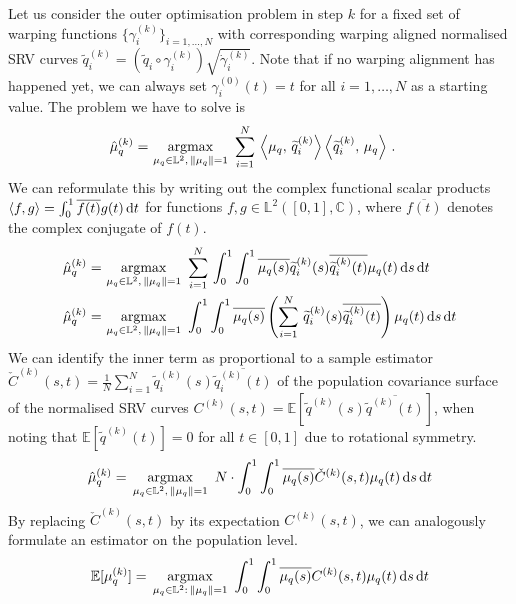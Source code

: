 Let us consider the outer optimisation problem in step $k$ for a fixed set of warping functions $\{\gamma_i^{(k)}\}_{i=1,\dots,N}$ with corresponding warping aligned normalised SRV curves $\widetilde q_i^{(k)} = ( \widetilde q_i \circ \gamma_i^{(k)}) \sqrt{\dot\gamma_i^{(k)}}$.
Note that if no warping alignment has happened yet, we can always set $\gamma_i^{(0)}(t) = t$ for all $i=1,\dots,N$ as a starting value.
The problem we have to solve is
\begin{align}
  \hat\mu_q^{(k)} = &\, \operatorname*{argmax}_{\mu_q \in \mathbb{L}^2,\,\lVert\mu_q\rVert = 1}\,\,
    \sum_{i=1}^N \, \left\langle \mu_q,\, \widetilde q_i^{(k)} \right\rangle \left\langle \widetilde q_i^{(k)},\, \mu_q \right\rangle\,.
\end{align}
We can reformulate this by writing out the complex functional scalar products $\langle f, g \rangle = \int_0^1 \overline{f(t)} g(t) \mathop{\mathrm{d}t}$ for functions $f,g \in \mathbb{L}^2([0,1], \mathbb{C})$, where $\overline{f(t)}$ denotes the complex conjugate of $f(t)$.
\begin{align}
  \hat\mu_q^{(k)} = &\, \operatorname*{argmax}_{\mu_q \in \mathbb{L}^2,\,\lVert\mu_q\rVert = 1}\,\,
    \sum_{i=1}^N \, \int_0^1 \int_0^1 \overline{\mu_q (s)} \widetilde q_i^{(k)}(s) \overline{\widetilde q_i^{(k)}(t)} \mu_q(t) \mathop{\mathrm{d}s}\mathop{\mathrm{d}t} \\
  \hat\mu_q^{(k)} = &\, \operatorname*{argmax}_{\mu_q \in \mathbb{L}^2,\,\lVert\mu_q\rVert = 1}\,\,
    \int_0^1 \int_0^1 \overline{\mu_q (s)} \left( \sum_{i=1}^N\, \widetilde q_i^{(k)}(s) \overline{ \widetilde q_i^{(k)}(t)} \right) \mu_q(t) \mathop{\mathrm{d}s}\mathop{\mathrm{d}t}
\end{align}
We can identify the inner term as proportional to a sample estimator $\check{C}^{(k)}(s,t) = \frac{1}{N} \sum_{i=1}^N \widetilde q_i^{(k)}(s) \overline{\widetilde q_i^{(k)}(t)}$ of the population covariance surface of the normalised SRV curves $C^{(k)}(s,t) = \mathbb{E}[\widetilde q^{(k)}(s) \overline{\widetilde q^{(k)}(t)}]$, when noting that $\mathbb{E}[\widetilde q^{(k)}(t)] = 0$ for all $t \in [0,1]$ due to rotational symmetry.
\begin{equation}
\hat\mu_q^{(k)} = \, \operatorname*{argmax}_{\mu_q \in \mathbb{L}^2,\,\lVert\mu_q\rVert = 1}\,\,
    N\cdot\int_0^1 \int_0^1 \overline{\mu_q (s)} \check C^{(k)}(s,t) \mu_q(t) \mathop{\mathrm{d}s}\mathop{\mathrm{d}t}
\end{equation}
By replacing $\check C^{(k)}(s,t)$ by its expectation $C^{(k)}(s,t)$, we can analogously formulate an estimator on the population level.
\begin{equation}
  \mathbb{E}[\mu_q^{(k)}] = \, \operatorname*{argmax}_{\mu_q \in \mathbb{L}^2:\,\lVert\mu_q\rVert = 1}\,\,
    \int_0^1 \int_0^1 \overline{\mu_q (s)} C^{(k)}(s,t) \mu_q(t) \mathop{\mathrm{d}s}\mathop{\mathrm{d}t}
\end{equation}
